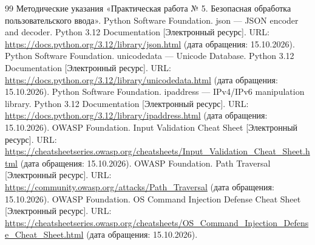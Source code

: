 \documentclass[12pt,a4paper]{article}
\begin{document}
\clearpage
\renewcommand{\refname}{Список использованных источников}
\begin{thebibliography}{99}
 Методические указания «Практическая работа № 5. Безопасная обработка пользовательского ввода».
 Python Software Foundation. json — JSON encoder and decoder. Python 3.12 Documentation [Электронный ресурс]. URL: \url{https://docs.python.org/3.12/library/json.html} (дата обращения: 15.10.2026).
 Python Software Foundation. unicodedata — Unicode Database. Python 3.12 Documentation [Электронный ресурс]. URL: \url{https://docs.python.org/3.12/library/unicodedata.html} (дата обращения: 15.10.2026).
 Python Software Foundation. ipaddress — IPv4/IPv6 manipulation library. Python 3.12 Documentation [Электронный ресурс]. URL: \url{https://docs.python.org/3.12/library/ipaddress.html} (дата обращения: 15.10.2026).
 \mbox{OWASP} Foundation. Input Validation Cheat Sheet [Электронный ресурс]. URL: \url{https://cheatsheetseries.owasp.org/cheatsheets/Input_Validation_Cheat_Sheet.html} (дата обращения: 15.10.2026).
 \mbox{OWASP} Foundation. Path Traversal [Электронный ресурс]. URL: \url{https://community.owasp.org/attacks/Path_Traversal} (дата обращения: 15.10.2026).
 \mbox{OWASP} Foundation. OS Command Injection Defense Cheat Sheet [Электронный ресурс]. URL: \url{https://cheatsheetseries.owasp.org/cheatsheets/OS_Command_Injection_Defense_Cheat_Sheet.html} (дата обращения: 15.10.2026).
\end{thebibliography}
\end{document}
